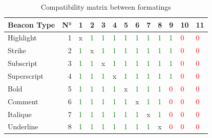 \documentclass[a4paper,12pt]{article}
\begin{document}
\begin{table}[htbp]
\caption{\label{tab:org734ee2d}Compatibility matrix between formatings}
\centering
\begin{tabular}{lrlllllllllll}
\hline
Beacon Type & N° & 1 & 2 & 3 & 4 & 5 & 6 & 7 & 8 & 9 & 10 & 11\\
\hline
Highlight & 1 & x & \textcolor{green}{1} & \textcolor{green}{1} & \textcolor{green}{1} & \textcolor{green}{1} & \textcolor{green}{1} & \textcolor{green}{1} & \textcolor{green}{1} & \textcolor{green}{1} & \textcolor{red}{0} & \textcolor{red}{0}\\
Strike & 2 & \textcolor{green}{1} & x & \textcolor{green}{1} & \textcolor{green}{1} & \textcolor{green}{1} & \textcolor{green}{1} & \textcolor{green}{1} & \textcolor{green}{1} & \textcolor{green}{1} & \textcolor{red}{0} & \textcolor{red}{0}\\
Subscript & 3 & \textcolor{green}{1} & \textcolor{green}{1} & x & \textcolor{green}{1} & \textcolor{green}{1} & \textcolor{green}{1} & \textcolor{green}{1} & \textcolor{green}{1} & \textcolor{green}{1} & \textcolor{red}{0} & \textcolor{red}{0}\\
Superscript & 4 & \textcolor{green}{1} & \textcolor{green}{1} & \textcolor{green}{1} & x & \textcolor{green}{1} & \textcolor{green}{1} & \textcolor{green}{1} & \textcolor{green}{1} & \textcolor{green}{1} & \textcolor{red}{0} & \textcolor{red}{0}\\
Bold & 5 & \textcolor{green}{1} & \textcolor{green}{1} & \textcolor{green}{1} & \textcolor{green}{1} & x & \textcolor{green}{1} & \textcolor{green}{1} & \textcolor{green}{1} & \textcolor{red}{0} & \textcolor{red}{0} & \textcolor{red}{0}\\
Comment & 6 & \textcolor{green}{1} & \textcolor{green}{1} & \textcolor{green}{1} & \textcolor{green}{1} & \textcolor{green}{1} & x & \textcolor{green}{1} & \textcolor{green}{1} & \textcolor{red}{0} & \textcolor{red}{0} & \textcolor{red}{0}\\
Italique & 7 & \textcolor{green}{1} & \textcolor{green}{1} & \textcolor{green}{1} & \textcolor{green}{1} & \textcolor{green}{1} & \textcolor{green}{1} & x & \textcolor{green}{1} & \textcolor{red}{0} & \textcolor{red}{0} & \textcolor{red}{0}\\
Underline & 8 & \textcolor{green}{1} & \textcolor{green}{1} & \textcolor{green}{1} & \textcolor{green}{1} & \textcolor{green}{1} & \textcolor{green}{1} & \textcolor{green}{1} & x & \textcolor{red}{0} & \textcolor{red}{0} & \textcolor{red}{0}\\

\end{tabular}
\end{table}
\end{document}
